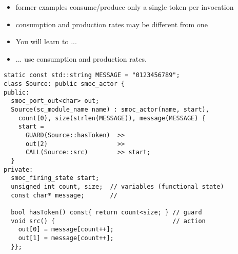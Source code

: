 \begin{frame}
\begin{itemize}
\item former examples consume/produce only a single token per invocation
\item consumption and production rates may be different from one
\end{itemize}
\begin{itemize}
\item You will learn to ...
\item ... use consumption and production rates.
\end{itemize}
\end{frame}




\begin{frame}[fragile=singleslide]
\begin{lstlisting}
static const std::string MESSAGE = "0123456789";
class Source: public smoc_actor {
public:
  smoc_port_out<char> out;
  Source(sc_module_name name) : smoc_actor(name, start),
    count(0), size(strlen(MESSAGE)), message(MESSAGE) {
    start = 
      GUARD(Source::hasToken)  >>
      out(2)                   >>
      CALL(Source::src)        >> start;
  }
private:
  smoc_firing_state start;
  unsigned int count, size;  // variables (functional state)
  const char* message;       //

  bool hasToken() const{ return count<size; } // guard
  void src() {                                // action
    out[0] = message[count++];
    out[1] = message[count++];
  }};
\end{lstlisting}
\end{frame}





